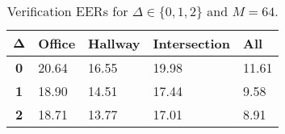 \begin{table}[h]
    \centering
    \begin{tabular}{|c|M{2cm}|M{2cm}|M{2cm}|M{2cm}|}
    \hline
    $\boldsymbol{\Delta}$ & \bf{Office} & \bf{Hallway} & \bf{Intersection} & \bf{All} \\ 
    \hline 
    \hline
    \bf{0} & 20.64 & 16.55 & 19.98 & 11.61 \\
    \hline
    \bf{1} & 18.90 & 14.51 & 17.44 & 9.58 \\
    \hline
    \bf{2} & 18.71 & 13.77 & 17.01 & 8.91 \\
    \hline
    \end{tabular}
    \caption{Verification EERs for $\Delta \in \{0, 1, 2\}$ and $M = 64$.}
    \label{tab:verify_adapted_m_M_64}
\end{table}
